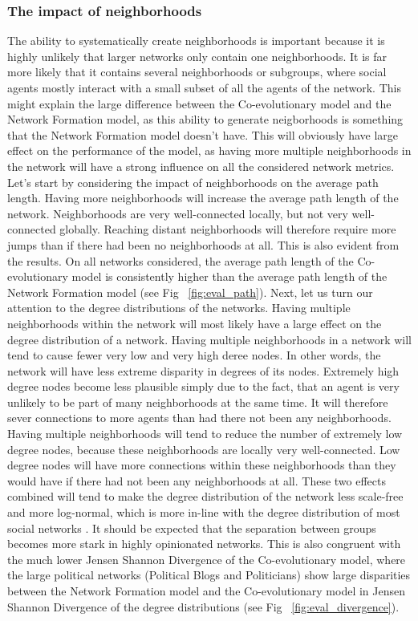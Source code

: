 \documentclass{article}
\begin{document}
\subsubsection{The impact of neighborhoods}
The ability to systematically create neighborhoods is important because it is highly unlikely that larger networks only contain one neighborhoods. It is far more likely that it contains several neighborhoods or subgroups, where social agents mostly interact with a small subset of all the agents of the network. 
This might explain the large difference between the Co-evolutionary model and the Network Formation model, as this ability to generate neigborhoods is something that the Network Formation model doesn't have. This will obviously have large effect on the performance of the model, as having more multiple neighborhoods in the network will have a strong influence on all the considered network metrics. 
Let's start by considering the impact of neighborhoods on the average path length. Having more neighborhoods will increase the average path length of the network. Neighborhoods are very well-connected locally, but not very well-connected globally. Reaching distant neighborhoods will therefore require more jumps than if there had been no neighborhoods at all. This is also evident from the results. On all networks considered, the average path length of the Co-evolutionary model is consistently higher than the average path length of the Network Formation model (see Fig ~\ref{fig:eval_path}).
Next, let us turn our attention to the degree distributions of the networks. Having multiple neighborhoods within the network will most likely have a large effect on the degree distribution of a network. Having multiple neighborhoods in a network will tend to cause fewer very low and very high deree nodes. In other words, the network will have less extreme disparity in degrees of its nodes. Extremely high degree nodes become less plausible simply due to the fact, that an agent is very unlikely to be part of many neighborhoods at the same time. It will therefore sever connections to more agents than had there not been any neighborhoods. Having multiple neighborhoods will tend to reduce the number of extremely low degree nodes, because these neighborhoods are locally very well-connected. Low degree nodes will have more connections within these neighborhoods than they would have if there had not been any neighborhoods at all. 
These two effects combined will tend to make the degree distribution of the network less scale-free and more log-normal, which is more in-line with the degree distribution of most social networks \cite{broido_scale-free_2019}. It should be expected that the separation between groups becomes more stark in highly opinionated networks. This is also congruent with the much lower Jensen Shannon Divergence of the Co-evolutionary model, where the large political networks (Political Blogs and Politicians) show large disparities between the Network Formation model and the Co-evolutionary model in Jensen Shannon Divergence of the degree distributions (see Fig ~\ref{fig:eval_divergence}).
\end{document}
